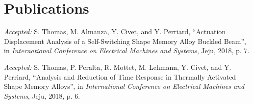 \section{Publications}
\begin{enumerate}[label={[\Alph*]},align=left]
  \item \emph{Accepted:} S. Thomas, M. Almanza, Y. Civet, and Y. Perriard, ``Actuation Displacement Analysis of a Self-Switching Shape Memory Alloy Buckled Beam'', in \emph{International Conference on Electrical Machines and Systems}, Jeju, 2018, p. 7. \label{bib:SelfSwitch}
  \item \emph{Accepted:} S. Thomas, P. Peralta, R. Mottet, M. Lehmann, Y. Civet, and Y. Perriard, ``Analysis and Reduction of Time Response in Thermally Activated Shape Memory Alloys'', in \emph{International Conference on Electrical Machines and Systems}, Jeju, 2018, p. 6. \label{bib:TimeResponse}
\end{enumerate}
